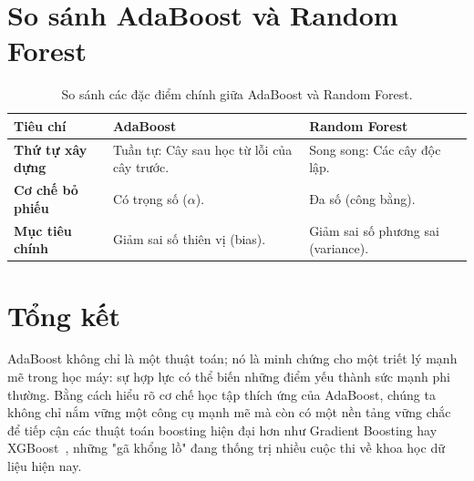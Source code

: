 \section{So sánh AdaBoost và Random Forest}
\begin{table}[H]
\centering
\begin{tabular}{|l|p{5cm}|p{5cm}|}
\hline
\textbf{Tiêu chí} & \textbf{AdaBoost} & \textbf{Random Forest}~\cite{breiman2001random} \\
\hline
\textbf{Thứ tự xây dựng} & Tuần tự: Cây sau học từ lỗi của cây trước. & Song song: Các cây độc lập. \\
\hline
\textbf{Cơ chế bỏ phiếu} & Có trọng số ($\alpha$). & Đa số (công bằng). \\
\hline
\textbf{Mục tiêu chính} & Giảm sai số thiên vị (bias). & Giảm sai số phương sai (variance). \\
\hline
\end{tabular}
\caption{So sánh các đặc điểm chính giữa AdaBoost và Random Forest.}
\label{tab:comparison}
\end{table}

\section{Tổng kết}
AdaBoost không chỉ là một thuật toán; nó là minh chứng cho một triết lý mạnh mẽ trong học máy: sự hợp lực có thể biến những điểm yếu thành sức mạnh phi thường. Bằng cách hiểu rõ cơ chế học tập thích ứng của AdaBoost, chúng ta không chỉ nắm vững một công cụ mạnh mẽ mà còn có một nền tảng vững chắc để tiếp cận các thuật toán boosting hiện đại hơn như Gradient Boosting hay XGBoost~\cite{chen2016xgboost}, những "gã khổng lồ" đang thống trị nhiều cuộc thi về khoa học dữ liệu hiện nay.